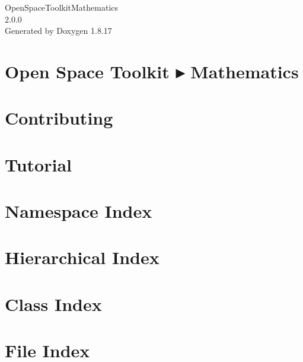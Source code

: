 \let\mypdfximage\pdfximage\def\pdfximage{\immediate\mypdfximage}\documentclass[twoside]{book}
\newcommand{\+}{\discretionary{\mbox{\scriptsize$\hookleftarrow$}}{}{}}
\newcommand{\clearemptydoublepage}{%
  \newpage{\pagestyle{empty}\cleardoublepage}%
}
\begin{document}
\hypersetup{pageanchor=false,
             bookmarksnumbered=true,
             pdfencoding=unicode
            }
\begin{titlepage}
\vspace*{7cm}
\begin{center}%
{\Large Open\+Space\+Toolkit\+Mathematics \\[1ex]\large 2.\+0.\+0 }\\
\vspace*{1cm}
{\large Generated by Doxygen 1.8.17}\\
\end{center}
\end{titlepage}
\clearemptydoublepage
{}
\tableofcontents
\clearemptydoublepage
{}
\hypersetup{pageanchor=true}

\chapter{Open Space Toolkit ▸ Mathematics}
\label{index}\hypertarget{index}{}
\chapter{Contributing}
\label{md__c_o_n_t_r_i_b_u_t_i_n_g}

\chapter{Tutorial}
\label{md_docs__tutorial}

\chapter{Namespace Index}

\chapter{Hierarchical Index}

\chapter{Class Index}

\chapter{File Index}

\end{document}
